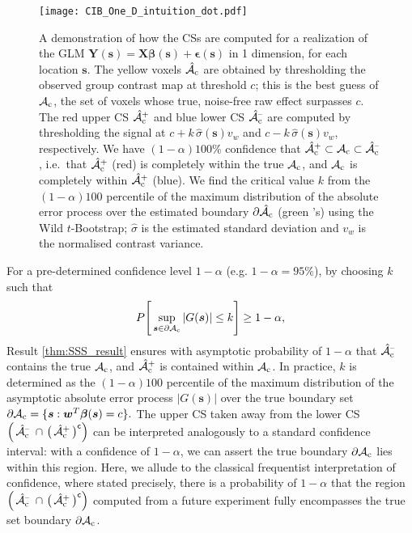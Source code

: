\begin{figure}[htbp]
\hspace*{-1.5cm}
\label{fig:one_d_intuiton}%
\centering
    \texttt{[image: CIB\_One\_D\_intuition\_dot.pdf]}
\caption{A demonstration of how the CSs are computed for a realization of the GLM $\bm{Y}(\bm{s}) = \bm{X}\bm{\beta}(\bm{s}) + \bm{\epsilon}(\bm{s})$ in 1 dimension, for each location $\bm{s}$.
The yellow voxels $\operatorname{\hat{\mathcal{A}}_{c}}$ are obtained by thresholding the observed group contrast map at threshold $c$; this is the best guess of $\operatorname{\mathcal{A}_{c}}$, the set of voxels whose true, noise-free raw effect surpasses $c$. 
The red upper CS $\operatorname{\hat{\mathcal{A}}_{c}^+}$ and blue lower CS $\operatorname{\hat{\mathcal{A}}_{c}^{\textrm{--}}}$ are computed by thresholding the signal at  $c + k\, \hat{\sigma}(\bm{s}) v_{w}$ and $c - k\, \hat{\sigma}(\bm{s}) v_{w}$, respectively. 
We have $(1-\alpha)100\%$ confidence that $\operatorname{\hat{\mathcal{A}}_{c}^+} \subset \operatorname{\mathcal{A}_{c}} \subset \operatorname{\hat{\mathcal{A}}_{c}^{\textrm{--}}}$, i.e.~that $\operatorname{\hat{\mathcal{A}}_{c}^+}$ (red) is completely within the true $\operatorname{\mathcal{A}_{c}}$, and $\operatorname{\mathcal{A}_{c}}$ is completely within $\operatorname{\hat{\mathcal{A}}_{c}^+}$ (blue). 
We find the critical value $k$ from the $(1-\alpha)100$ percentile of the maximum distribution of the absolute error process over the estimated boundary $\operatorname{\partial\hat{\mathcal{A}}_{c}}$ (green \newmoon's) using the Wild $t$-Bootstrap; $\hat\sigma$ is the estimated standard deviation and $v_w$ is the normalised contrast variance.}
\end{figure}

For a pre-determined confidence level $1 - \alpha$ (e.g. $1 - \alpha = 95\%$),  by choosing $k$ such that 
\begin{equation}
\label{eq:probability_statement}
P \Bigg[\sup_{\bm{s}\in\operatorname{\partial\mathcal{A}_{c}}}|G(\bm{s})|\leq k\Bigg] \geq 1-\alpha,
\end{equation}
Result \ref{thm:SSS_result} ensures with asymptotic probability of $1 - \alpha$ that $\operatorname{\hat{\mathcal{A}}_{c}^{\textrm{--}}}$ contains the true  $\operatorname{\mathcal{A}_{c}}$,  and $\operatorname{\hat{\mathcal{A}}_{c}^+}$ is contained within $\operatorname{\mathcal{A}_{c}}$. In practice,  $k$ is determined as the $(1-\alpha)100$ percentile of the maximum distribution of the asymptotic absolute error process $|G(\bm{s})|$ over the true boundary set $\operatorname{\partial\mathcal{A}_{c}} = \{\bm{s} : \bm{w}^{T}\bm{\beta}(\bm{s}) = c\}.$ The upper CS taken away from the lower CS $\Big(\Ahatcm \ \cap \ \big(\Ahatcp\big)^{\mathsf{c}}\Big)$ can be interpreted analogously to a standard confidence interval: with a confidence of $1 - \alpha$, we can assert the true boundary $\operatorname{\partial\mathcal{A}_{c}}$ lies within this region. Here, we allude to the classical frequentist interpretation of confidence, where stated precisely, there is a probability of $1 - \alpha$ that the region $\Big(\Ahatcm \ \cap \ \big(\Ahatcp\big)^{\mathsf{c}}\Big)$ computed from a future experiment fully encompasses the true set boundary $\operatorname{\partial\mathcal{A}_{c}}$.

